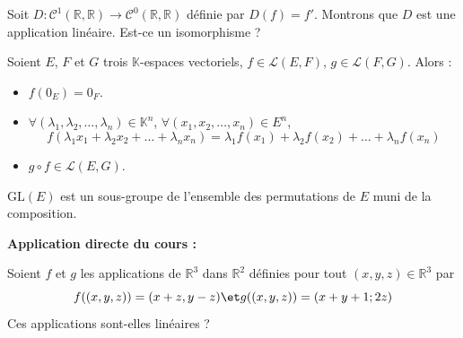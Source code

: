 \documentclass[french,11pt,twoside]{VcCours}
\newenvironment{ApplicationDirecte}{\textbf{Application directe du cours :}

}{}
\begin{document}
\begin{Exemple} Soit $D : \mathcal{C}^1(\mathbb{R}, \mathbb{R}) \rightarrow \mathcal{C}^0(\mathbb{R}, \mathbb{R})$ définie par $D(f)=f'$. Montrons que $D$ est une application linéaire. Est-ce un isomorphisme ?


\vspace{5cm}
\end{Exemple}

\begin{Proposition}{}
Soient $E$, $F$ et $G$ trois $\mathbb{K}$-espaces vectoriels, $f \in \mathcal{L}(E,F)$, $g \in \mathcal{L}(F,G)$. Alors :

\begin{itemize}
\item $f(0_E)=0_F$.
\item $\forall (\lambda_1, \lambda_2, \ldots, \lambda_n) \in \mathbb{K}^n$, $\forall (x_1,x_2, \ldots, x_n) \in E^n$,
$$ f( \lambda_1x_1+ \lambda_2 x_2 + \ldots + \lambda_n x_n) = \lambda_1 f(x_1) + \lambda_2 f(x_2) + \ldots + \lambda_n f(x_n) $$
\item $g \circ f \in \mathcal{L}(E,G)$.
\end{itemize}
\end{Proposition}

\begin{Remarque}{} $\textrm{GL}(E)$ est un sous-groupe de l'ensemble des permutations de $E$ muni de la composition.
\end{Remarque}

\begin{ApplicationDirecte} 
	Soient $f$ et $g$ les applications de $\mathbb{R}^3$ dans $\mathbb{R}^2$ 
	définies pour tout $(x,y,z) \in \mathbb{R}^3$ par 
	\[f((x,y,z))=(x+z,y-z) \et g((x,y,z))= (x+y+1;2z)\]
	Ces applications sont-elles linéaires ?
\end{ApplicationDirecte} 
\end{document}

